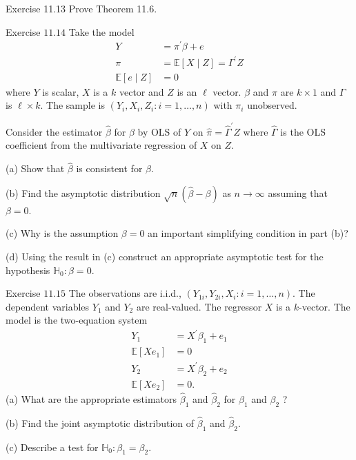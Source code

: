 \documentclass[10pt]{article}
\begin{document}
Exercise 11.13 Prove Theorem 11.6.

Exercise $11.14$ Take the model
$$
\begin{aligned}
Y &=\pi^{\prime} \beta+e \\
\pi &=\mathbb{E}[X \mid Z]=\Gamma^{\prime} Z \\
\mathbb{E}[e \mid Z] &=0
\end{aligned}
$$
where $Y$ is scalar, $X$ is a $k$ vector and $Z$ is an $\ell$ vector. $\beta$ and $\pi$ are $k \times 1$ and $\Gamma$ is $\ell \times k$. The sample is $\left(Y_{i}, X_{i}, Z_{i}: i=1, \ldots, n\right)$ with $\pi_{i}$ unobserved.

Consider the estimator $\widehat{\beta}$ for $\beta$ by OLS of $Y$ on $\widehat{\pi}=\widehat{\Gamma}^{\prime} Z$ where $\widehat{\Gamma}$ is the OLS coefficient from the multivariate regression of $X$ on $Z$.

(a) Show that $\widehat{\beta}$ is consistent for $\beta$.

(b) Find the asymptotic distribution $\sqrt{n}(\widehat{\beta}-\beta)$ as $n \rightarrow \infty$ assuming that $\beta=0$.

(c) Why is the assumption $\beta=0$ an important simplifying condition in part (b)?

(d) Using the result in (c) construct an appropriate asymptotic test for the hypothesis $\mathbb{H}_{0}: \beta=0$.

Exercise $11.15$ The observations are i.i.d., $\left(Y_{1 i}, Y_{2 i}, X_{i}: i=1, \ldots, n\right)$. The dependent variables $Y_{1}$ and $Y_{2}$ are real-valued. The regressor $X$ is a $k$-vector. The model is the two-equation system
$$
\begin{aligned}
Y_{1} &=X^{\prime} \beta_{1}+e_{1} \\
\mathbb{E}\left[X e_{1}\right] &=0 \\
Y_{2} &=X^{\prime} \beta_{2}+e_{2} \\
\mathbb{E}\left[X e_{2}\right] &=0 .
\end{aligned}
$$
(a) What are the appropriate estimators $\widehat{\beta}_{1}$ and $\widehat{\beta}_{2}$ for $\beta_{1}$ and $\beta_{2}$ ?

(b) Find the joint asymptotic distribution of $\widehat{\beta}_{1}$ and $\widehat{\beta}_{2}$.

(c) Describe a test for $\mathbb{H}_{0}: \beta_{1}=\beta_{2}$.
\end{document}
